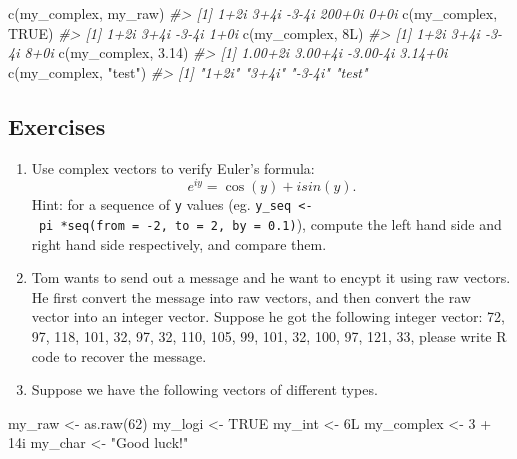 \documentclass[
]{book}
\newenvironment{Shaded}{\begin{snugshade}}{\end{snugshade}}
\newcommand{\CommentTok}[1]{\textcolor[rgb]{0.56,0.35,0.01}{\textit{#1}}}
\newcommand{\ConstantTok}[1]{\textcolor[rgb]{0.00,0.00,0.00}{#1}}
\newcommand{\DecValTok}[1]{\textcolor[rgb]{0.00,0.00,0.81}{#1}}
\newcommand{\FloatTok}[1]{\textcolor[rgb]{0.00,0.00,0.81}{#1}}
\newcommand{\FunctionTok}[1]{\textcolor[rgb]{0.00,0.00,0.00}{#1}}
\newcommand{\NormalTok}[1]{#1}
\newcommand{\OtherTok}[1]{\textcolor[rgb]{0.56,0.35,0.01}{#1}}
\newcommand{\SpecialCharTok}[1]{\textcolor[rgb]{0.00,0.00,0.00}{#1}}
\newcommand{\StringTok}[1]{\textcolor[rgb]{0.31,0.60,0.02}{#1}}
\begin{document}
\begin{Shaded}
\begin{Highlighting}[]
\FunctionTok{c}\NormalTok{(my\_complex, my\_raw)}
\CommentTok{\#\textgreater{} [1]   1+2i   3+4i  {-}3{-}4i 200+0i   0+0i}
\FunctionTok{c}\NormalTok{(my\_complex, }\ConstantTok{TRUE}\NormalTok{)}
\CommentTok{\#\textgreater{} [1]  1+2i  3+4i {-}3{-}4i  1+0i}
\FunctionTok{c}\NormalTok{(my\_complex, 8L)}
\CommentTok{\#\textgreater{} [1]  1+2i  3+4i {-}3{-}4i  8+0i}
\FunctionTok{c}\NormalTok{(my\_complex, }\FloatTok{3.14}\NormalTok{)}
\CommentTok{\#\textgreater{} [1]  1.00+2i  3.00+4i {-}3.00{-}4i  3.14+0i}
\FunctionTok{c}\NormalTok{(my\_complex, }\StringTok{"test"}\NormalTok{)}
\CommentTok{\#\textgreater{} [1] "1+2i"  "3+4i"  "{-}3{-}4i" "test"}
\end{Highlighting}
\end{Shaded}

\hypertarget{exercises-19}{%
\subsection{Exercises}\label{exercises-19}}

\begin{enumerate}
\def\labelenumi{\arabic{enumi}.}
\item
  Use complex vectors to verify Euler's formula:
  \[e^{iy} = \cos(y) + i sin(y).\]
  Hint: for a sequence of \texttt{y} values (eg. \texttt{y\_seq\ \textless{}-\ pi\ *seq(from\ =\ -2,\ to\ =\ 2,\ by\ =\ 0.1)}), compute the left hand side and right hand side respectively, and compare them.
\item
  Tom wants to send out a message and he want to encypt it using raw vectors. He first convert the message into raw vectors, and then convert the raw vector into an integer vector. Suppose he got the following integer vector: 72, 97, 118, 101, 32, 97, 32, 110, 105, 99, 101, 32, 100, 97, 121, 33, please write R code to recover the message.
\item
  Suppose we have the following vectors of different types.
\end{enumerate}

\begin{Shaded}
\begin{Highlighting}[]
\NormalTok{my\_raw }\OtherTok{\textless{}{-}} \FunctionTok{as.raw}\NormalTok{(}\DecValTok{62}\NormalTok{)}
\NormalTok{my\_logi }\OtherTok{\textless{}{-}} \ConstantTok{TRUE}
\NormalTok{my\_int }\OtherTok{\textless{}{-}}\NormalTok{ 6L}
\NormalTok{my\_complex }\OtherTok{\textless{}{-}} \DecValTok{3} \SpecialCharTok{+}\NormalTok{ 14i}
\NormalTok{my\_char }\OtherTok{\textless{}{-}} \StringTok{"Good luck!"}
\end{Highlighting}
\end{Shaded}
\end{document}
